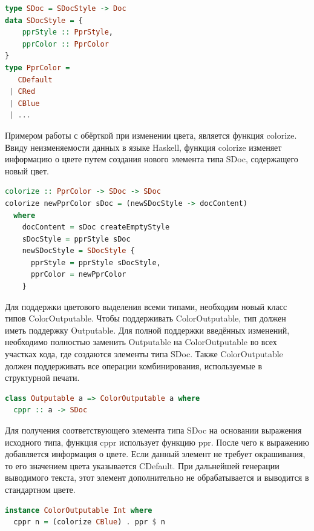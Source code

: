 \begin{lstlisting}[language=Haskell, caption=Дополненная реализация типа SDoc]
type SDoc = SDocStyle -> Doc
data SDocStyle = {
    pprStyle :: PprStyle,
    pprColor :: PprColor
}
type PprColor =
   CDefault
 | CRed
 | CBlue
 | ...
\end{lstlisting}

Примером работы с обёрткой при изменении цвета, является функция colorize. Ввиду неизменяемости данных в языке Haskell, функция colorize изменяет информацию о цвете путем создания нового элемента типа SDoc, содержащего новый цвет.

\begin{lstlisting}[language=Haskell, caption=Пример функции окраски]
colorize :: PprColor -> SDoc -> SDoc
colorize newPprColor sDoc = (newSDocStyle -> docContent)
  where 
    docContent = sDoc createEmptyStyle
    sDocStyle = pprStyle sDoc  
    newSDocStyle = SDocStyle { 
      pprStyle = pprStyle sDocStyle, 
      pprColor = newPprColor 
    }
\end{lstlisting}

Для поддержки цветового выделения всеми типами, необходим новый класс типов ColorOutputable. Чтобы поддерживать ColorOutputable, тип должен иметь поддержку Outputable. Для полной поддержки введённых изменений, необходимо полностью заменить Outputable на ColorOutputable во всех участках кода, где создаются элементы типа SDoc. Также ColorOutputable должен поддерживать все операции комбинирования, используемые в структурной печати.

\begin{lstlisting}[language=Haskell, caption=Класс типов ColorOutputable]
class Outputable a => ColorOutputable a where
  cppr :: a -> SDoc
\end{lstlisting}

Для получения соответствующего элемента типа SDoc на основании выражения исходного типа, функция cppr использует функцию ppr. После чего к выражению добавляется информация о цвете. Если данный элемент не требует окрашивания, то его значением цвета указывается CDefault. При дальнейшей генерации выводимого текста, этот элемент дополнительно не обрабатывается и выводится в стандартном цвете.

\begin{lstlisting}[language=Haskell, caption=Пример реализации ColorOutputable для типа Int]
instance ColorOutputable Int where
  cppr n = (colorize CBlue) . ppr $ n
\end{lstlisting}

